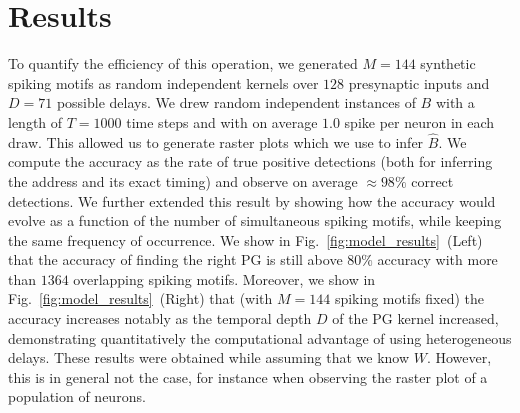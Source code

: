 \documentclass[runningheads]{llncs}
\newcommand{\fig}[1]{Fig.~\ref{fig:#1}}%
\begin{document}
\section{Results}
%
To quantify the efficiency of this operation, we generated $M=144$ synthetic spiking motifs as random independent kernels over $128$ presynaptic inputs and $D=71$ possible delays. We drew random independent instances of $B$ with a length of $T=1000$ time steps and with on average $1.0$ spike per neuron in each draw. This allowed us to generate raster plots which we use to infer $\hat{B}$. We compute the accuracy as the rate of true positive detections (both for inferring the address and its exact timing) and observe on average $\approx 98\%$ correct detections. We further extended this result by showing how the accuracy would evolve as a function of the number of simultaneous spiking motifs, while keeping the same frequency of occurrence. We show in \fig{model_results}~(Left) that the accuracy of finding the right PG is still above $80\%$ accuracy with more than $1364$ overlapping spiking motifs. Moreover, we show in \fig{model_results}~(Right) that (with $M=144$ spiking motifs fixed) the accuracy increases notably as the temporal depth $D$ of the PG kernel increased, demonstrating quantitatively the computational advantage of using heterogeneous delays. These results were obtained while assuming that we know $W$. However, this is in general not the case, for instance when observing the raster plot of a population of neurons. %
\end{document}
